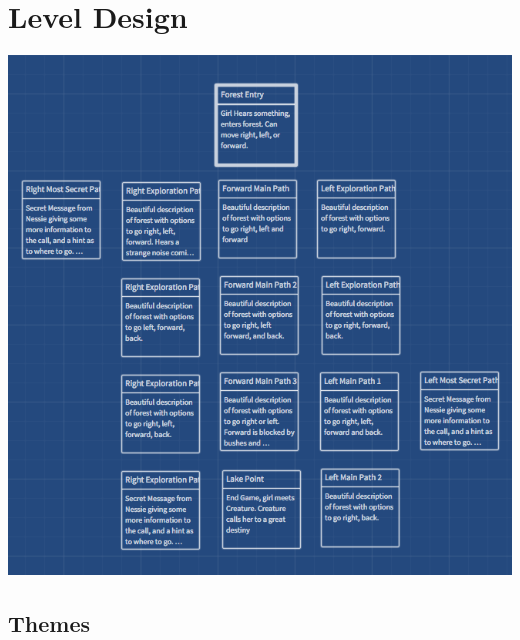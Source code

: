 \documentclass[letterpaper, twoside, 12pt]{memoir}
\begin{document}
\chapter{Level Design}

\begin{center}
\includegraphics[scale=0.5]{Basic-Map-design.png}
\end{center}

\section{Themes}
\end{document}
